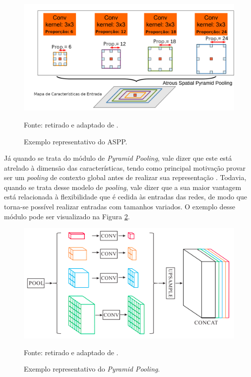 \begin{figure}[H]
    \centering
    \caption{Exemplo representativo do ASPP.}
    \includegraphics[width=1\textwidth]{recursos/imagens/proposal/aspp.png}
    \label{proposal:pcapooling:fig:1}

    Fonte: retirado e adaptado de \cite{Chen2018}.
\end{figure}

Já quando se trata do módulo de \textit{Pyramid Pooling}, vale dizer que este está atrelado à dimensão das características, tendo como principal motivação provar ser um \textit{pooling} de contexto global antes de realizar sua representação \cite{Zhao2017}. Todavia, quando se trata desse modelo de \textit{pooling}, vale dizer que a sua maior vantagem está relacionada à flexibilidade que é cedida às entradas das redes, de modo que torna-se possível realizar entradas com tamanhos variados. O exemplo desse módulo pode ser visualizado na Figura \ref{proposal:pcapooling:fig:2}.

\begin{figure}[H]
    \centering
    \caption{Exemplo representativo do \textit{Pyramid Pooling}.}
    \includegraphics[width=1\textwidth]{recursos/imagens/proposal/pyramidal.png}
    \label{proposal:pcapooling:fig:2}

    Fonte: retirado e adaptado de \cite{Zhao2017}.
\end{figure}

